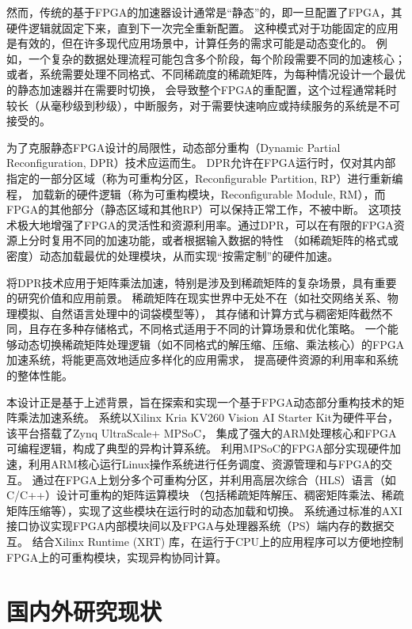 然而，传统的基于FPGA的加速器设计通常是“静态”的，即一旦配置了FPGA，其硬件逻辑就固定下来，直到下一次完全重新配置。
这种模式对于功能固定的应用是有效的，但在许多现代应用场景中，计算任务的需求可能是动态变化的。
例如，一个复杂的数据处理流程可能包含多个阶段，每个阶段需要不同的加速核心；
或者，系统需要处理不同格式、不同稀疏度的稀疏矩阵，为每种情况设计一个最优的静态加速器并在需要时切换，
会导致整个FPGA的重配置，这个过程通常耗时较长（从毫秒级到秒级），中断服务，对于需要快速响应或持续服务的系统是不可接受的\cite{blodget2003self}。

为了克服静态FPGA设计的局限性，动态部分重构（Dynamic Partial Reconfiguration, DPR）技术应运而生\cite{xilinx2024vivado,vipin2018fpga}。
DPR允许在FPGA运行时，仅对其内部指定的一部分区域（称为可重构分区，Reconfigurable Partition, RP）进行重新编程，
加载新的硬件逻辑（称为可重构模块，Reconfigurable Module, RM），而FPGA的其他部分（静态区域和其他RP）可以保持正常工作，不被中断\cite{beckhoff2012go,koch2012partial}。
这项技术极大地增强了FPGA的灵活性和资源利用率。通过DPR，可以在有限的FPGA资源上分时复用不同的加速功能，或者根据输入数据的特性
（如稀疏矩阵的格式或密度）动态加载最优的处理模块，从而实现“按需定制”的硬件加速。

将DPR技术应用于矩阵乘法加速，特别是涉及到稀疏矩阵的复杂场景，具有重要的研究价值和应用前景。
稀疏矩阵在现实世界中无处不在（如社交网络关系、物理模拟、自然语言处理中的词袋模型等），
其存储和计算方式与稠密矩阵截然不同，且存在多种存储格式，不同格式适用于不同的计算场景和优化策略\cite{saad2003iterative}。
一个能够动态切换稀疏矩阵处理逻辑（如不同格式的解压缩、压缩、乘法核心）的FPGA加速系统，将能更高效地适应多样化的应用需求，
提高硬件资源的利用率和系统的整体性能。

本设计正是基于上述背景，旨在探索和实现一个基于FPGA动态部分重构技术的矩阵乘法加速系统。
系统以Xilinx Kria KV260 Vision AI Starter Kit为硬件平台，该平台搭载了Zynq UltraScale+ MPSoC，
集成了强大的ARM处理核心和FPGA可编程逻辑，构成了典型的异构计算系统\cite{xilinx2024kv260}。
利用MPSoC的FPGA部分实现硬件加速，利用ARM核心运行Linux操作系统进行任务调度、资源管理和与FPGA的交互。
通过在FPGA上划分多个可重构分区，并利用高层次综合（HLS）语言（如C/C++）设计可重构的矩阵运算模块
（包括稀疏矩阵解压、稠密矩阵乘法、稀疏矩阵压缩等），实现了这些模块在运行时的动态加载和切换。
系统通过标准的AXI接口协议实现FPGA内部模块间以及FPGA与处理器系统（PS）端内存的数据交互。
结合Xilinx Runtime (XRT) 库，在运行于CPU上的应用程序可以方便地控制FPGA上的可重构模块，实现异构协同计算。

\section{国内外研究现状}

